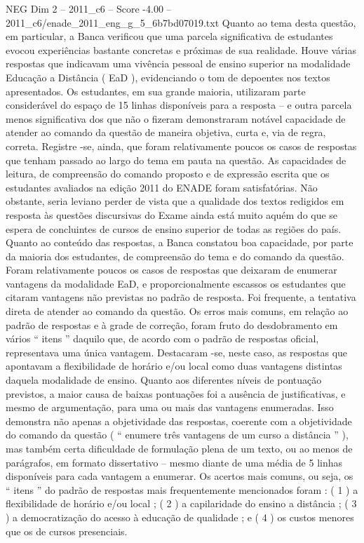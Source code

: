 \begin{textsample}{NEG Dim 2 – 2011\_c6 – Score -4.00 – 2011\_c6/enade\_2011\_eng\_g\_5\_6b7bd07019.txt}
Quanto ao tema desta questão, em particular, a Banca verificou que uma parcela significativa de estudantes evocou experiências bastante concretas e próximas de sua realidade.
Houve várias respostas que indicavam uma vivência pessoal de ensino superior na modalidade Educação a Distância ( EaD ), evidenciando o tom de depoentes nos textos apresentados.
Os estudantes, em sua grande maioria, utilizaram parte considerável do espaço de 15 linhas disponíveis para a resposta – e outra parcela menos significativa dos que não o fizeram demonstraram notável capacidade de atender ao comando da questão de maneira objetiva, curta e, via de regra, correta.
Registre -se, ainda, que foram relativamente poucos os casos de respostas que tenham passado ao largo do tema em pauta na questão.
As capacidades de leitura, de compreensão do comando proposto e de expressão escrita que os estudantes avaliados na edição 2011 do ENADE foram satisfatórias.
Não obstante, seria leviano perder de vista que a qualidade dos textos redigidos em resposta às questões discursivas do Exame ainda está muito aquém do que se espera de concluintes de cursos de ensino superior de todas as regiões do país.
Quanto ao conteúdo das respostas, a Banca constatou boa capacidade, por parte da maioria dos estudantes, de compreensão do tema e do comando da questão.
Foram relativamente poucos os casos de respostas que deixaram de enumerar vantagens da modalidade EaD, e proporcionalmente escassos os estudantes que citaram vantagens não previstas no padrão de resposta.
Foi frequente, a tentativa direta de atender ao comando da questão.
Os erros mais comuns, em relação ao padrão de respostas e à grade de correção, foram fruto do desdobramento em vários “ itens ” daquilo que, de acordo com o padrão de respostas oficial, representava uma única vantagem.
Destacaram -se, neste caso, as respostas que apontavam a flexibilidade de horário e/ou local como duas vantagens distintas daquela modalidade de ensino.
Quanto aos diferentes níveis de pontuação previstos, a maior causa de baixas pontuações foi a ausência de justificativas, e mesmo de argumentação, para uma ou mais das vantagens enumeradas.
Isso demonstra não apenas a objetividade das respostas, coerente com a objetividade do comando da questão ( “ enumere três vantagens de um curso a distância ” ), mas também certa dificuldade de formulação plena de um texto, ou ao menos de parágrafos, em formato dissertativo – mesmo diante de uma média de 5 linhas disponíveis para cada vantagem a enumerar.
Os acertos mais comuns, ou seja, os “ itens ” do padrão de respostas mais frequentemente mencionados foram : ( 1 ) a flexibilidade de horário e/ou local ; ( 2 ) a capilaridade do ensino a distância ; ( 3 ) a democratização do acesso à educação de qualidade ; e ( 4 ) os custos menores que os de cursos presenciais.

\end{textsample}
